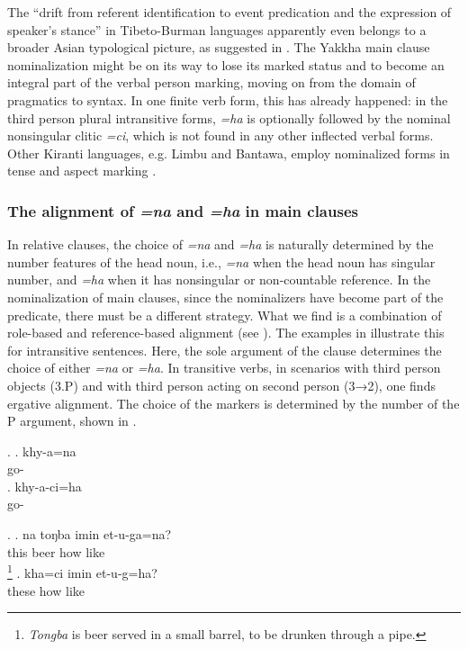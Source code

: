The “drift from referent identification to event predication and the expression of speaker’s stance” in Tibeto-Burman languages apparently even belongs to a broader Asian typological picture, as suggested in \citet{Yapetal2010_Non-referential}. The Yakkha main clause nominalization might be on its way to lose its marked status and to become an integral part of the verbal person marking, moving on from the domain of pragmatics to syntax. In one finite verb form, this has already happened: in the third person plural intransitive forms, \emph{=ha} is optionally followed by the nominal nonsingular clitic \emph{=ci}, which is not found in any other inflected verbal forms. Other Kiranti languages, e.g. Limbu and Bantawa, employ nominalized forms in tense and aspect marking \citep{Driem1993Einige, Doornenbal2008_Nominalization}. 



\subsubsection{The alignment of \emph{=na} and \emph{=ha} in main clauses}

In relative clauses, the choice of  \emph{=na} and \emph{=ha} is naturally determined by the number features of the head noun, i.e., \emph{=na} when the head noun has singular number, and \emph{=ha} when it has nonsingular or non-countable reference. In the nominalization of main clauses, since the nominalizers have become part of the predicate, there must be a different strategy.  What we find is a combination of role-based and reference-based alignment (see ). The examples in  \Next illustrate this for intransitive sentences. Here, the sole argument of the clause determines the choice of either  \emph{=na} or \emph{=ha}. In transitive verbs, in scenarios with third person objects (3.P) and with third person acting on second person (3→2), one finds ergative alignment. The choice of the markers is determined by the number of the P argument, shown in  \NNext. 


\ex. \ag. khy-a=na\\
go-\\
\bg. khy-a-ci=ha\\
go-\\


\ex.  \ag. 	na toŋba imin et-u-ga=na?\\
			this beer how like\\
			\footnote{\emph{Tongba} is  beer served in a small barrel, to be drunken through a pipe.}
	\bg.	kha=ci imin et-u-g=ha?\\
			these how like\\ 



